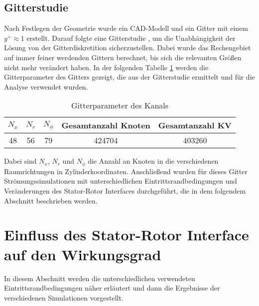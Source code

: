 \subsection{Gitterstudie}
\label{subsec:kanalgitterstudie}
Nach Festlegen der Geometrie wurde ein CAD-Modell und ein Gitter mit einem $y^+ \approx 1$ erstellt. Darauf folgte eine Gitterstudie , um die Unabhängigkeit der Lösung von der Gitterdiskretition sicherzustellen. Dabei wurde das Rechengebiet auf immer feiner werdenden Gittern berechnet, bis sich die relevanten Größen nicht mehr verändert haben. In der folgenden Tabelle \ref{tab:kanalgitter} werden die Gitterparameter des Gitters gezeigt, die aus der Gitterstudie ermittelt und für die Analyse verwendet wurden. 
\begin{table}[H]
\centering
\caption{Gitterparameter des Kanals}
\begin{tabular}{ c| c| c| c| c}
$N_x$&$N_r$&$N_\phi$&Gesamtanzahl Knoten&Gesamtanzahl KV\\
\hline
48&56&79 &424704&403260\\
\end{tabular}
\label{tab:kanalgitter}
\end{table}
Dabei sind $N_x$, $N_r$ und $N_\phi$ die Anzahl an Knoten in die verschiedenen Raumrichtungen in Zylinderkoordinaten.\newline
Anschließend wurden für dieses Gitter Strömungssimulationen mit unterschiedlichen Eintrittsrandbedingungen und Veränderungen des Stator-Rotor Interfaces durchgeführt, die in dem folgendem Abschnitt beschrieben werden.

\section{Einfluss des Stator-Rotor Interface auf den Wirkungsgrad}
\label{kanaleinfluss}
In diesem Abschnitt werden die unterschiedlichen verwendeten Eintrittsrandbedingungen näher erläutert und dann die Ergebnisse der verschiedenen Simulationen vorgestellt.
